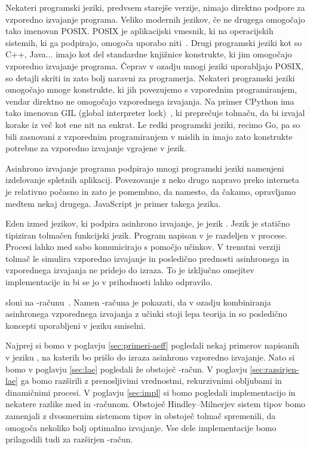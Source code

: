 


Nekateri programski jeziki, predvsem starejše verzije, nimajo direktno podpore za vzporedno izvajanje programa. 
Veliko modernih jezikov, če ne drugega omogočajo tako imenovan POSIX. POSIX je aplikacijski vmesnik, ki na operacijskih sistemih, ki ga podpirajo, omogoča uporabo niti~\cite{posix}.
Drugi programski jeziki kot so C++, Java... imajo kot del standardne knjižnice konstrukte, ki jim omogočajo vzporedno izvajanje programa. Čeprav v ozadju mnogi jeziki uporabljajo POSIX, so detajli skriti in zato bolj naravni za programerja. 
Nekateri programski jeziki omogočajo mnoge konstrukte, ki jih povezujemo s vzporednim programiranjem, vendar direktno ne omogočajo vzporednega izvajanja. Na primer CPython ima tako imenovan GIL (global  interpreter lock)~\cite{gil}, ki preprečuje tolmaču, da bi izvajal korake iz več kot ene nit na enkrat.
Le redki programski jeziki, recimo Go, pa so bili zasnovani z vzporednim programiranjem v mislih in imajo zato konstrukte potrebne za vzporedno izvajanje vgrajene v jezik.

Asinhrono izvajanje programa podpirajo mnogi programski jeziki namenjeni izdelovanje spletnih aplikacij. Povezovanje z neko drugo napravo preko interneta je relativno počasno in zato je pomembno, da namesto, da čakamo, opravljamo medtem nekaj drugega. JavaScript je primer takega jezika. 



Eden izmed jezikov, ki podpira asinhrono izvajanje, je jezik \aeff{}. Jezik \aeff{} je statično tipiziran tolmačen funkcijski jezik. Program napisan v \aeff{} je razdeljen v procese. Procesi lahko med sabo komunicirajo s pomočjo učinkov. V trenutni verziji tolmač le simulira vzporedno izvajanje in posledično prednosti asinhronega in vzporednega izvajanja ne pridejo do izraza. To je izključno omejitev implementacije in bi se jo v prihodnosti lahko odpravilo.

\aeff{} sloni na \lae{}-računu~\cite{aeff}. Namen \lae{}-računa je pokazati, da v ozadju kombiniranja asinhronega vzporednega izvajanja z učinki stoji lepa teorija in so posledično koncepti uporabljeni v jeziku \aeff{} smiselni.


Najprej si bomo v poglavju \ref{sec:primeri-aeff} pogledali nekaj primerov napisanih v jeziku \aeff{}, na katerih bo prišlo do izraza asinhrono vzporedno izvajanje.
Nato si bomo v poglavju \ref{sec:lae} pogledali že obstoječ \lae{}-račun. V poglavju \ref{sec:razsirjen-lae} ga bomo razširili z prenosljivimi vrednostmi, rekurzivnimi obljubami in dinamičnimi procesi. V poglavju \ref{sec:impl} si bomo pogledali implementacijo \aeff{} in nekatere razlike med \aeff{} in \lae{}-računom. Obstoječ Hindley–Milnerjev sistem tipov bomo zamenjali z dvosmernim sistemom tipov in obstoječ tolmač spremenili, da omogoča nekoliko bolj optimalno izvajanje. Vse dele implementacije bomo prilagodili tudi za razširjen \lae-račun.

